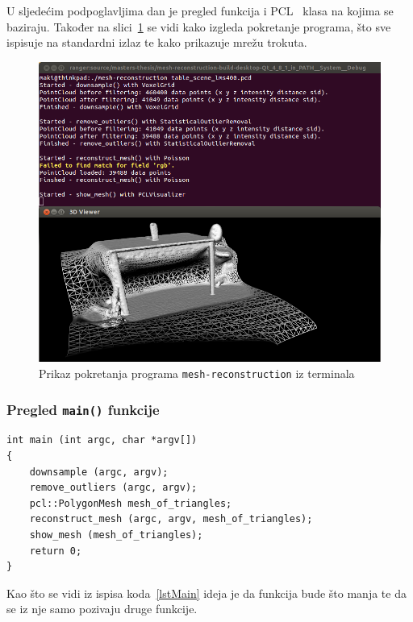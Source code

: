 U sljedećim podpoglavljima dan je pregled funkcija i PCL~\cite{1184}
klasa na kojima se baziraju. Također na
slici~\ref{fig:running-mesh-reconstruction} se vidi kako izgleda
pokretanje programa, što sve ispisuje na standardni izlaz te kako
prikazuje mrežu trokuta.

\newpage
\setcounter{figure}{1}
\begin{figure}[h]
\centering
\includegraphics[scale=0.5]{figures/running-mesh-reconstruction.png}
\caption{Prikaz pokretanja programa \texttt{mesh-reconstruction} iz
terminala}
\label{fig:running-mesh-reconstruction}
\end{figure}

\newpage
\subsubsection{Pregled \texttt{main()} funkcije} %
\label{ssub:Pregled main funkcije}
\begin{lstlisting}[label=lstMain,caption={Izvorni kod
\texttt{main()} funkcije }]
int main (int argc, char *argv[])
{
    downsample (argc, argv);
    remove_outliers (argc, argv);
    pcl::PolygonMesh mesh_of_triangles;
    reconstruct_mesh (argc, argv, mesh_of_triangles);
    show_mesh (mesh_of_triangles);
    return 0;
}
\end{lstlisting}
Kao što se vidi iz ispisa koda~\ref{lstMain} ideja je da funkcija bude
što manja te da se iz nje samo pozivaju druge funkcije. 

